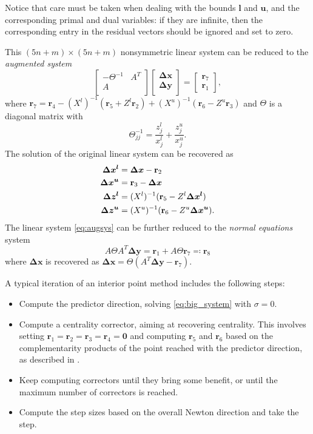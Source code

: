 \documentclass[a4paper]{article}
\newcommand{\lvec}{\mathbf l}
\newcommand{\rvec}{\mathbf r}
\newcommand{\uvec}{\mathbf u}
\newcommand{\0}{\mathbf 0}
\newcommand{\dx}{\boldsymbol{\Delta x}}
\newcommand{\dxl}{\boldsymbol{\Delta x^l}}
\newcommand{\dxu}{\boldsymbol{\Delta x^u}}
\newcommand{\dy}{\boldsymbol{\Delta y}}
\newcommand{\dzl}{\boldsymbol{\Delta z^l}}
\newcommand{\dzu}{\boldsymbol{\Delta z^u}}
\begin{document}
Notice that care must be taken when dealing with the bounds $\lvec$ and $\uvec$, and the corresponding primal and dual variables: if they are infinite, then the corresponding entry in the residual vectors should be ignored and set to zero.


This $(5n+m)\times(5n+m)$ nonsymmetric linear system can be reduced to the {\it augmented system}
\begin{equation}
\label{eq:augsys}
\begin{bmatrix}
-\Theta^{-1} & A^T \\ A & \\
\end{bmatrix}
\begin{bmatrix}
\dx \\ \dy \\
\end{bmatrix}
=
\begin{bmatrix}
\rvec_7 \\ \rvec_1
\end{bmatrix},
\end{equation}
where $\rvec_7=\rvec_4-(X^l)^{-1}(\rvec_5+Z^l\rvec_2)+(X^u)^{-1}(\rvec_6-Z^u\rvec_3)$ and $\Theta$ is a diagonal matrix with 
\[\Theta_{jj}^{-1} = \frac{z^l_j}{x^l_j}+\frac{z^u_j}{x^u_j}.\]
The solution of the original linear system can be recovered as
\begin{align}
\dxl &= \dx-\rvec_2                 \notag\\
\dxu &= \rvec_3 - \dx               \notag\\
\dzl &= (X^l)^{-1}(\rvec_5-Z^l\dxl) \notag\\
\dzu &= (X^u)^{-1}(\rvec_6-Z^u\dxu) \notag.
\end{align}
The linear system \eqref{eq:augsys} can be further reduced to the {\it normal equations} system
\begin{equation}
\label{eq:normeq}
A\Theta A^T\dy = \rvec_1+A\Theta\rvec_7 \eqqcolon \rvec_8
\end{equation}
where $\dx$ is recovered as $\dx=\Theta(A^T\dy-\rvec_7)$.

A typical iteration of an interior point method includes the following steps:
\begin{itemize}
\item Compute the predictor direction, solving \eqref{eq:big_system} with $\sigma=0$.
\item Compute a centrality corrector, aiming at recovering centrality. This involves setting $\rvec_1=\rvec_2=\rvec_3=\rvec_4=\0$ and computing $\rvec_5$ and $\rvec_6$ based on the complementarity products of the point reached with the predictor direction, as described in \cite{ColGon:mcc}.
\item Keep computing correctors until they bring some benefit, or until the maximum number of correctors is reached.
\item Compute the step sizes based on the overall Newton direction and take the step.
\end{itemize}
\end{document}
